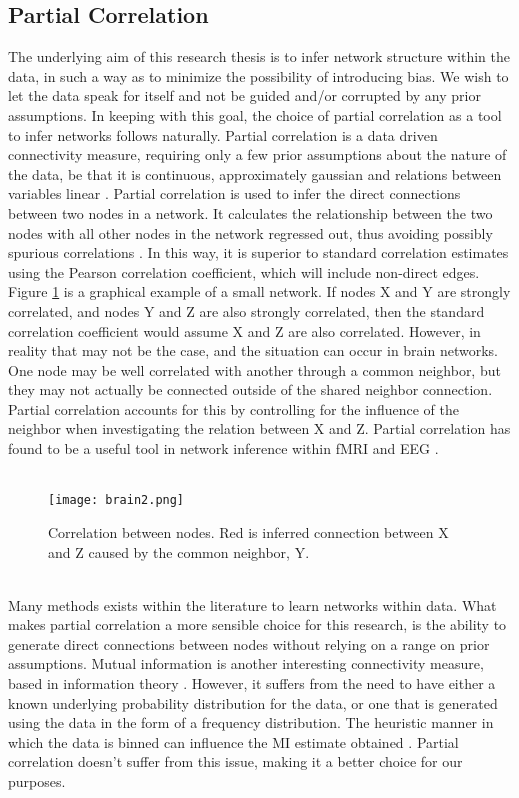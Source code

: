 \documentclass[11pt]{article}
\begin{document}
\subsection{Partial Correlation}
The underlying aim of this research thesis is to infer network structure within the data, in such a way as to minimize the possibility of introducing bias. We wish to let the data speak for itself and not be guided and/or corrupted by any prior assumptions. In keeping with this goal, the choice of partial correlation as a tool to infer networks follows naturally. Partial correlation is a data driven connectivity measure, requiring only a few prior assumptions about the nature of the data, be that it is continuous, approximately gaussian and relations between variables linear \citep{linn}. Partial correlation is used to infer the direct connections between two nodes in a network. It calculates the relationship between the two nodes with all other nodes in the network regressed out, thus avoiding possibly spurious correlations \citep{zalesky2012use}. In this way, it is superior to standard correlation estimates using the Pearson correlation coefficient, which will include non-direct edges. Figure \ref{b2} is a graphical example of a small network. If nodes X and Y are strongly correlated, and nodes Y and Z are also strongly correlated, then the standard correlation coefficient would assume X and Z are also correlated. However, in reality that may not be the case, and the situation can occur in brain networks. One node may be well correlated with another through a common neighbor, but they may not actually be connected outside of the shared neighbor connection. Partial correlation accounts for this by controlling for the influence of the neighbor when investigating the relation between X and Z. Partial correlation has found to be a useful tool in network inference within fMRI and EEG \citep{marrelec2006partial, wangpc}.\\
\\
\begin{figure}%
\centering\texttt{[image: brain2.png]}%
\caption{Correlation between nodes. Red is inferred connection between X and Z caused by the common neighbor, Y.}
\label{b2}
\end{figure}\\ 
Many methods exists within the literature to learn networks within data. What makes partial correlation a more sensible choice for this research, is the ability to generate direct connections between nodes without relying on a range on prior assumptions. Mutual information is another interesting connectivity measure, based in information theory \citep{mackay}. However, it suffers from the need to have either a known underlying probability distribution for the data, or one that is generated using the data in the form of a frequency distribution. The heuristic manner in which the data is binned can influence the MI estimate obtained \citep{MIC1}. Partial correlation doesn't suffer from this issue, making it a better choice for our purposes.
\end{document}
